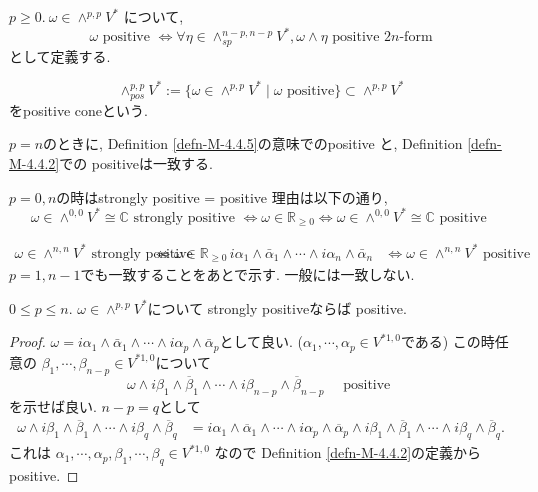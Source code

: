 \begin{tcolorbox}[mybox]
\begin{defn}
\label{defn-M-4.4.5}
 \(p\ge 0.\ \omega\in \wedge^{p,p}V^*\) について, 
 \[\omega \text{ positive }\Longleftrightarrow\forall \eta\in \wedge_{sp}^{n-p,n-p}V^*,\omega\wedge\eta \text{ positive } 2n\text{-form}\]
 として定義する. 
 
$$
\wedge_{pos}^{p,p}V^{*}:= \{ \omega \in \wedge^{p,p}V^{*} \mid \text{$\omega$ positive}\}\subset 
\wedge^{p,p}V^{*}
$$
をpositive coneという.
\end{defn}
\end{tcolorbox}
 $p=n$のときに, Definition \ref{defn-M-4.4.5}の意味でのpositive と, 
Definition \ref{defn-M-4.4.2}での positiveは一致する.
 
 \begin{rem}
 $p=0, n$の時はstrongly positive = positive 
 理由は以下の通り, 
\[
\omega\in \wedge^{0,0}V^* \cong \mathbb{C}
\text{ strongly positive }
\Longleftrightarrow
\omega\in \mathbb{R}_{\ge 0}
\Longleftrightarrow
\omega\in \wedge^{0,0}V^* \cong \mathbb{C}
\text{  positive }
\]

\begin{align*}
\omega\in \wedge^{n,n}V^*
\text{ strongly positive}
&\Longleftrightarrow
\omega\in \mathbb{R}_{\ge 0}\,
i\alpha_1\wedge\bar{\alpha}_1\wedge\cdots\wedge i\alpha_n\wedge\bar{\alpha}_n
&\Longleftrightarrow
\omega\in \wedge^{n,n}V^* \text{  positive }
\end{align*}
 $p=1, n-1$でも一致することをあとで示す. 一般には一致しない. 
 \end{rem}




\begin{tcolorbox}[mybox]
\begin{lem}
\label{lem-M-4.4.6}
 \(0\le p\le n\). \(\omega\in \wedge^{p,p}V^*\)について
strongly positiveならば positive.
\end{lem}
\end{tcolorbox}
\begin{proof}

\(\omega=i\alpha_1\wedge \bar{\alpha}_1\wedge \cdots \wedge i\alpha_p\wedge \bar{\alpha}_p\)として良い. ($\alpha_1,\cdots,\alpha_p\in V^{*1,0}$である)
この時任意の \(\beta_1,\cdots,\beta_{n-p}\in V^{*1,0}\)について
 \[
 \omega\wedge i\beta_1\wedge \overline{\beta}_1\wedge \cdots \wedge i\beta_{n-p}\wedge \overline{\beta}_{n-p} \quad \text{  positive }
\]
を示せば良い. 
\(n-p=q\)として
\begin{align*}
\omega\wedge i\beta_1\wedge \overline{\beta}_1\wedge \cdots \wedge i\beta_q\wedge \overline{\beta}_q
&= i\alpha_1\wedge \overline{\alpha}_1\wedge \cdots \wedge i\alpha_p\wedge \overline{\alpha}_p
\wedge i\beta_1\wedge \overline{\beta}_1\wedge \cdots \wedge i\beta_q\wedge \overline{\beta}_q.
\end{align*}
これは \(\alpha_1,\cdots,\alpha_p,\beta_1,\cdots,\beta_q\in V^{*1,0}\) なので Definition \ref{defn-M-4.4.2}の定義からpositive.
\end{proof}


